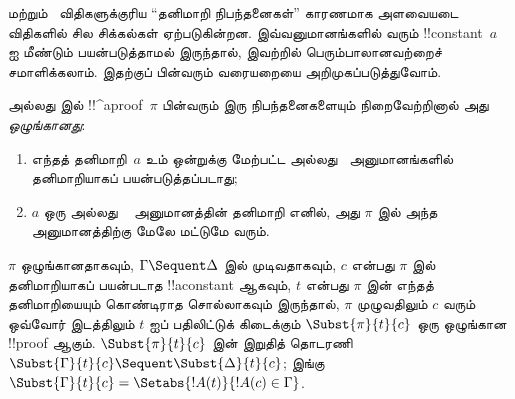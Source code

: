 \documentclass[../../../include/open-logic-section]{subfiles}
\begin{document}


\LeftR{\lexists} மற்றும்~\RightR{\lforall}
விதிகளுக்குரிய ``தனிமாறி நிபந்தனைகள்''
காரணமாக அளவையடை விதிகளில் சில சிக்கல்கள்
ஏற்படுகின்றன. இவ்வனுமானங்களில் வரும்
!!{constant}~$a$ ஐ மீண்டும் பயன்படுத்தாமல்
இருந்தால், இவற்றில் பெரும்பாலானவற்றைச்
சமாளிக்கலாம். இதற்குப் பின்வரும்
வரையறையை அறிமுகப்படுத்துவோம்.

\begin{defn}
 அல்லது  இல்
!!^a{proof}~$\pi$ பின்வரும் இரு
நிபந்தனைகளையும் நிறைவேற்றினால் அது
\emph{ஒழுங்கானது}:
\begin{enumerate}
  \item எந்தத் தனிமாறி~$a$ உம் ஒன்றுக்கு மேற்பட்ட
  \LeftR{\lexists} அல்லது~\RightR{\lforall}
  அனுமானங்களில் தனிமாறியாகப் பயன்படுத்தப்படாது;
  \item $a$ ஒரு \LeftR{\lexists} அல்லது
  ~\RightR{\lforall} அனுமானத்தின் தனிமாறி எனில்,
  அது $\pi$ இல் அந்த அனுமானத்திற்கு மேலே
  மட்டுமே வரும்.
\end{enumerate}
\end{defn}

\begin{lem}
$\pi$ ஒழுங்கானதாகவும்,
$\Gamma \Sequent \Delta$ இல் முடிவதாகவும்,
$c$ என்பது $\pi$ இல் தனிமாறியாகப்
பயன்படாத !!a{constant} ஆகவும்,
$t$ என்பது $\pi$ இன் எந்தத் தனிமாறியையும்
கொண்டிராத சொல்லாகவும் இருந்தால்,
$\pi$ முழுவதிலும் $c$ வரும் ஒவ்வோர் இடத்திலும்
$t$ ஐப் பதிலிட்டுக் கிடைக்கும்
$\Subst{\pi}{t}{c}$ ஒரு ஒழுங்கான !!{proof} ஆகும்.
$\Subst{\pi}{t}{c}$ இன் இறுதித் தொடரணி
$\Subst{\Gamma}{t}{c}
\Sequent \Subst{\Delta}{t}{c}$;
இங்கு $\Subst{\Gamma}{t}{c} =
\Setabs{!A(t)}{!A(c) \in \Gamma}$.
\end{lem}
\end{document}

